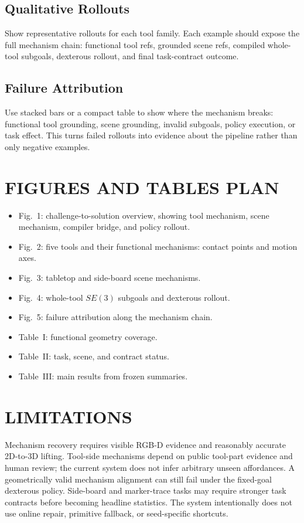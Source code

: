 \documentclass[letterpaper, 10 pt, conference]{ieeeconf}
\begin{document}
\subsection{Qualitative Rollouts}
Show representative rollouts for each tool family. Each example should expose
the full mechanism chain: functional tool refs, grounded scene refs, compiled
whole-tool subgoals, dexterous rollout, and final task-contract outcome.

\subsection{Failure Attribution}
Use stacked bars or a compact table to show where the mechanism breaks:
functional tool grounding, scene grounding, invalid subgoals, policy execution,
or task effect. This turns failed rollouts into evidence about the pipeline
rather than only negative examples.

\section{FIGURES AND TABLES PLAN}

\begin{itemize}
  \item Fig.~1: challenge-to-solution overview, showing tool mechanism, scene
  mechanism, compiler bridge, and policy rollout.
  \item Fig.~2: five tools and their functional mechanisms: contact points and
  motion axes.
  \item Fig.~3: tabletop and side-board scene mechanisms.
  \item Fig.~4: whole-tool $SE(3)$ subgoals and dexterous rollout.
  \item Fig.~5: failure attribution along the mechanism chain.
  \item Table~I: functional geometry coverage.
  \item Table~II: task, scene, and contract status.
  \item Table~III: main results from frozen summaries.
\end{itemize}

\section{LIMITATIONS}

Mechanism recovery requires visible RGB-D evidence and reasonably accurate
2D-to-3D lifting. Tool-side mechanisms depend on public tool-part evidence and
human review; the current system does not infer arbitrary unseen affordances. A
geometrically valid mechanism alignment can still fail under the fixed-goal
dexterous policy. Side-board and marker-trace tasks may require stronger task
contracts before becoming headline statistics. The system intentionally does
not use online repair, primitive fallback, or seed-specific shortcuts.
\end{document}
